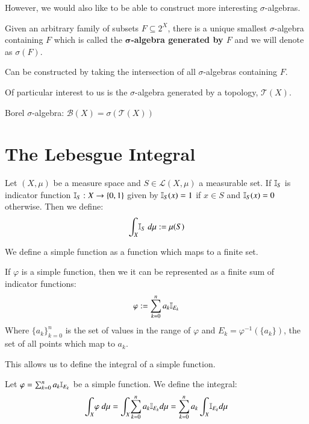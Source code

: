 However, we would also like to be able to construct more interesting $\sigma$-algebras.

\begin{definition}
Given an arbitrary family of subsets $F \subseteq 2^X$, there is a unique smallest $\sigma$-algebra containing $F$ which is called the \textbf{$\mathbf{\sigma}$-algebra generated by $F$} and we will denote as $\sigma(F)$.
\end{definition}

Can be constructed by taking the intersection of all $\sigma$-algebras containing $F$.

Of particular interest to us is the $\sigma$-algebra generated by a topology, $\mathcal{T}(X)$. 

Borel $\sigma$-algebra: $\mathcal{B}(X) = \sigma(\mathcal{T}(X))$

\section{The Lebesgue Integral}

\begin{definition}
Let $(X, \mu )$ be a measure space and $S \in \mathcal{L}(X, \mu)$ a measurable set. If $\ind[S]$ is indicator function $\ind[S] : X \to \{ 0, 1 \}$ given by $\ind[S] (x) = 1$ if $x \in S$ and $\ind[S] (x) = 0$ otherwise.
Then we define:
\begin{equation}
\int_X \! \ind[S] \; d \mu := \mu ( S )
\end{equation}
\end{definition}

We define a simple function as a function which maps to a finite
set.
\begin{theorem}
If $\varphi$ is a simple function, then we it can be represented as a finite sum of indicator functions:
\begin{equation}
\varphi := \sum_{k=0}^n a_k \ind[E_k]
\end{equation}
Where $\{ a_k \}_{k=0}^n$ is the set of values in the range of $\varphi$ and $E_k = \varphi^{-1}( \{ a_k \} )$, the set of all points which map to $a_k$.
\end{theorem}

This allows us to define the integral of a simple function.

\begin{definition}
Let $\varphi = \sum_{k=0}^n a_k \ind[E_k]$ be a simple function. We define the integral:
\begin{equation}
\int_X \! \varphi \; d \mu = \int_X \! \sum_{k=0}^n a_k \ind[E_k] d \mu = \sum_{k=0}^n a_k  \int_X \! \ind[E_k] d \mu
\end{equation}
\end{definition}

